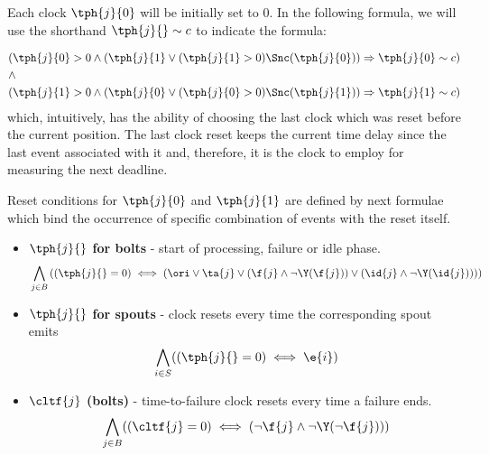 Each clock $ \tph{j}{0} $ will be initially set to 0. 
In the following formula, we will use the shorthand $ \tph{j}{} \sim c$ to indicate the formula:


\begin{align*}
%
&  (\tph{j}{0} >  0 \land  (\tph{j}{1} \lor (\tph{j}{1} > 0) \Snc (\tph{j}{0})) \Rightarrow \tph{j}{0} \sim c )\\
%
& \land \\
%
& (\tph{j}{1} >  0 \land  (\tph{j}{0} \lor (\tph{j}{0} > 0) \Snc (\tph{j}{1})) \Rightarrow \tph{j}{1} \sim c )\\
%
\end{align*} 
%
which, intuitively, has the ability of choosing the last clock which was reset before the current position. 
The last clock reset keeps the current time delay since the last event associated with it and, therefore, it is the clock to employ for measuring the next deadline.

Reset conditions for $\tph{j}{0}$ and $\tph{j}{1}$ are defined by next formulae which bind the occurrence of specific combination of events with the reset itself.

\begin{itemize}
 \item \textbf{ $ \tph{j}{} $ for bolts} - start of processing, failure or idle phase.
\begin{align*}
%
& \bigwedge_{
	\begin{subarray}{c}
	j \in B\\
	\end{subarray}
}
\left(
(\tph{j}{} =  0) \iff %
\left(\ori \lor \ta{j} \lor %
(\f{j} \land \lnot \Y (\f{j}) )  \lor %
(\id{j} \land \lnot \Y (\id{j}) ) \right) 
\right)\\ 
%
\end{align*} 
 \item \textbf{$ \tph{j}{} $ for spouts } - clock resets every time the corresponding spout emits
\begin{align*}
%
& \bigwedge_{
	\begin{subarray}{c}
	i \in S\\
	\end{subarray}
}
((\tph{j}{} =  0) \iff 
\e{i})\\ 
%
\end{align*} 
 \item \textbf{$ \cltf{j} $ (bolts)} - time-to-failure clock resets every time a failure ends.
\begin{align*}
%
& \bigwedge_{
	\begin{subarray}{c}
	j \in B\\
	\end{subarray}
}
((\cltf{j} =  0) \iff 
 (\lnot \f{j} \land \lnot \Y (\lnot \f{j})))\\ 
%
\end{align*} 
\end{itemize}

